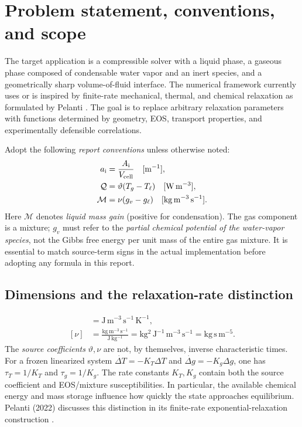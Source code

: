 \documentclass[11pt,letterpaper]{article}
\newcommand{\mi}{\mathrm{i}}
\newcommand{\area}{a_\mi}
\newcommand{\gdiff}{\Delta g}
\newcommand{\mcal}{\mathcal{M}}
\newcommand{\qcal}{\mathcal{Q}}
\begin{document}
\section{Problem statement, conventions, and scope}
The target application is a compressible solver with a liquid phase, a gaseous phase composed of condensable water vapor and an inert species, and a geometrically sharp volume-of-fluid interface. The numerical framework currently uses or is inspired by finite-rate mechanical, thermal, and chemical relaxation as formulated by Pelanti \cite{Pelanti2022,Pelanti2026}. The goal is to replace arbitrary relaxation parameters with functions determined by geometry, EOS, transport properties, and experimentally defensible correlations.

Adopt the following \emph{report conventions} unless otherwise noted:
\begin{align}
\area &= \frac{A_\mi}{V_{\rm cell}}\quad [\mathrm{m^{-1}}],\\
\qcal &= \vartheta(T_g-T_\ell)\quad [\mathrm{W\,m^{-3}}],\\
\mcal &= \nu(g_v-g_\ell)\quad [\mathrm{kg\,m^{-3}\,s^{-1}}].
\end{align}
Here $\mcal$ denotes \emph{liquid mass gain} (positive for condensation). The gas component is a mixture; $g_v$ must refer to the \emph{partial chemical potential of the water-vapor species}, not the Gibbs free energy per unit mass of the entire gas mixture. It is essential to match source-term signs in the actual implementation before adopting any formula in this report.

\subsection{Dimensions and the relaxation-rate distinction}
\begin{align}
[\vartheta]&=\mathrm{J\,m^{-3}\,s^{-1}\,K^{-1}},\\
[\nu]&=\frac{\mathrm{kg\,m^{-3}\,s^{-1}}}{\mathrm{J\,kg^{-1}}}
=\mathrm{kg^2\,J^{-1}\,m^{-3}\,s^{-1}}=\mathrm{kg\,s\,m^{-5}}.
\end{align}
The \emph{source coefficients} $\vartheta,\nu$ are not, by themselves, inverse characteristic times. For a frozen linearized system $\dot{\Delta T}=-K_T\Delta T$ and $\dot{\gdiff}=-K_g\gdiff$, one has $\tau_T=1/K_T$ and $\tau_g=1/K_g$. The rate constants $K_T,K_g$ contain both the source coefficient and EOS/mixture susceptibilities. In particular, the available chemical energy and mass storage influence how quickly the state approaches equilibrium. Pelanti (2022) discusses this distinction in its finite-rate exponential-relaxation construction \cite{Pelanti2022}.
\end{document}
